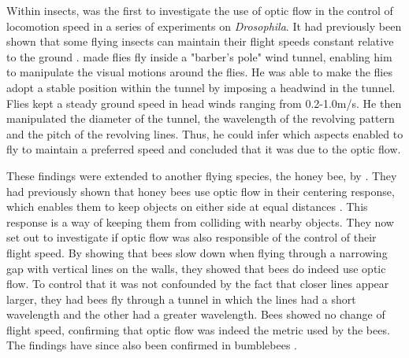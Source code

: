 Within insects, \textcite{David1982CompensationTunnel} was the first to investigate the use of optic flow in the control of locomotion speed in a series of experiments on \textit{Drosophila}. It had previously been shown that some flying insects can maintain their flight speeds constant relative to the ground \autocite{David1979OptomotorDrosophila.}. \textcite{David1982CompensationTunnel} made flies fly inside a "barber's pole" wind tunnel, enabling him to manipulate the visual motions around the flies. He was able to make the flies adopt a stable position within the tunnel by imposing a headwind in the tunnel. Flies kept a steady ground speed in head winds ranging from 0.2-1.0m/s. He then manipulated the diameter of the tunnel, the wavelength of the revolving pattern and the pitch of the revolving lines. Thus, he could infer which aspects enabled to fly to maintain a preferred speed and concluded that it was due to the optic flow.

These findings were extended to another flying species, the honey bee, by \textcite{Srinivasan1996}. They had previously shown that honey bees use optic flow in their centering response, which enables them to keep objects on either side at equal distances \autocite{Srinivasan1991RangeHoneybees}. This response is a way of keeping them from colliding with nearby objects. They now set out to investigate if optic flow was also responsible of the control of their flight speed. By showing that bees slow down when flying through a narrowing gap with vertical lines on the walls, they showed that bees do indeed use optic flow. To control that it was not confounded by the fact that closer lines appear larger, they had bees fly through a tunnel in which the lines had a short wavelength and the other had a greater wavelength. Bees showed no change of flight speed, confirming that optic flow was indeed the metric used by the bees. The findings have since also been confirmed in bumblebees \autocite{Linander2015}. 